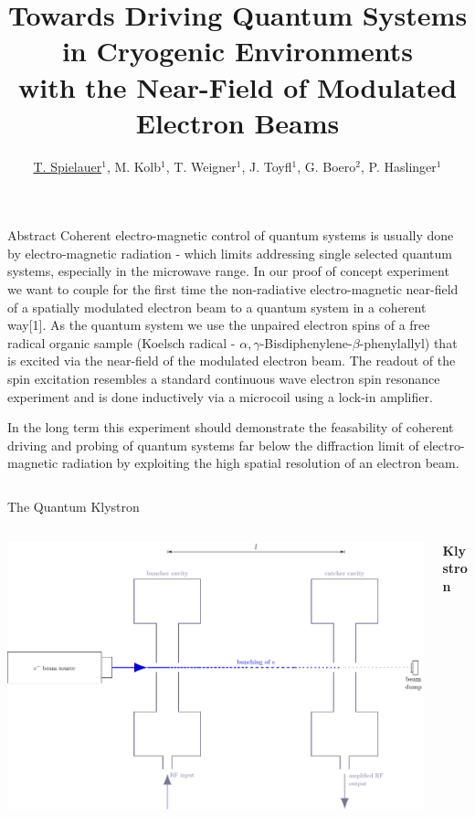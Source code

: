 \documentclass[final]{beamer}
\title{Towards Driving Quantum Systems in Cryogenic Environments\hspace*{1cm} \\ with the Near-Field of Modulated Electron Beams}
\author{\underline{T. Spielauer$^{1}$}, M. Kolb$^{1}$, T. Weigner$^{1}$, J. Toyfl$^{1}$, G. Boero$^{2}$, P. Haslinger$^{1}$ }
\institute[]{
  {\small
  $^{1}$VCQ, Technische Universität Wien, Atominstitut, Stadionallee 2, 1020 Vienna, Austria; $^{2}$EPFL, BM 3110 Station 17, CH-1015 Lausanne, Switzerland
  }
}
\begin{document}
\begin{frame}[fragile]{}
  \begin{block}{\Large Abstract}
    Coherent electro-magnetic control of quantum systems is usually done by
    electro-magnetic radiation - which limits addressing single selected
    quantum systems, especially in the microwave range. In our proof of concept
    experiment we want to couple for the first time the non-radiative electro-magnetic
    near-field of a spatially modulated electron beam to a quantum system in
    a coherent way[1].  As the quantum system we
    use the unpaired electron spins of a free radical organic sample (Koelsch radical
    - $\alpha,\gamma$-Bisdiphenylene-$\beta$-phenylallyl) that is excited via the
    near-field of the modulated electron beam. The readout of the spin excitation
    resembles a standard continuous wave electron spin resonance experiment and is
    done inductively via a microcoil using a lock-in amplifier.

    In the long term this experiment should demonstrate the feasability of
    coherent driving and probing of quantum systems far below the diffraction
    limit of electro-magnetic radiation by exploiting the high spatial resolution of an
    electron beam.
  \end{block}
  \begin{columns}[T]
    \begin{column}{.49\linewidth}
      \begin{block}{\Large The Quantum Klystron}

        \begin{columns}
          \begin{column}{0.45\columnwidth}
              \includegraphics[width=\columnwidth]{figures/klystron.pdf}
          \end{column}
          \begin{column}{0.55\columnwidth}\begin{center}
              {\large \textbf{Klystron}}
            \end{center}


\end{column}
\end{columns}
\end{block}
\end{column}
\end{columns}
\end{frame}
\end{document}
